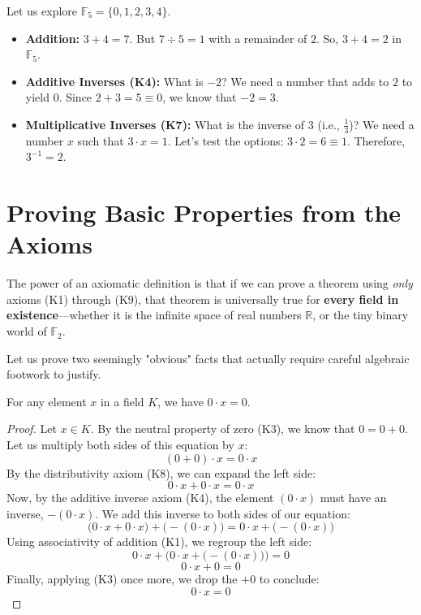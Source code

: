 \begin{example}
Let us explore $\mathbb{F}_5 = \{0, 1, 2, 3, 4\}$.
\begin{itemize}
    \item \textbf{Addition:} $3 + 4 = 7$. But $7 \div 5 = 1$ with a remainder of $2$. So, $3 + 4 = 2$ in $\mathbb{F}_5$.
    \item \textbf{Additive Inverses (K4):} What is $-2$? We need a number that adds to $2$ to yield $0$. Since $2 + 3 = 5 \equiv 0$, we know that $-2 = 3$.
    \item \textbf{Multiplicative Inverses (K7):} What is the inverse of $3$ (i.e., $\frac{1}{3}$)? We need a number $x$ such that $3 \cdot x = 1$. Let's test the options: $3 \cdot 2 = 6 \equiv 1$. Therefore, $3^{-1} = 2$.
\end{itemize}
\end{example}

\section{Proving Basic Properties from the Axioms}

The power of an axiomatic definition is that if we can prove a theorem using \textit{only} axioms (K1) through (K9), that theorem is universally true for \textbf{every field in existence}—whether it is the infinite space of real numbers $\mathbb{R}$, or the tiny binary world of $\mathbb{F}_2$.

Let us prove two seemingly "obvious" facts that actually require careful algebraic footwork to justify.

\begin{lemma}
For any element $x$ in a field $K$, we have $0 \cdot x = 0$.
\end{lemma}

\begin{proof}
Let $x \in K$. By the neutral property of zero (K3), we know that $0 = 0 + 0$. 
Let us multiply both sides of this equation by $x$:
\[
(0 + 0) \cdot x = 0 \cdot x
\]
By the distributivity axiom (K8), we can expand the left side:
\[
0 \cdot x + 0 \cdot x = 0 \cdot x
\]
Now, by the additive inverse axiom (K4), the element $(0 \cdot x)$ must have an inverse, $-(0 \cdot x)$. We add this inverse to both sides of our equation:
\[
\big(0 \cdot x + 0 \cdot x\big) + \big(-(0 \cdot x)\big) = 0 \cdot x + \big(-(0 \cdot x)\big)
\]
Using associativity of addition (K1), we regroup the left side:
\[
0 \cdot x + \Big(0 \cdot x + \big(-(0 \cdot x)\big)\Big) = 0
\]
\[
0 \cdot x + 0 = 0
\]
Finally, applying (K3) once more, we drop the $+ 0$ to conclude:
\[
0 \cdot x = 0
\]
\end{proof}


